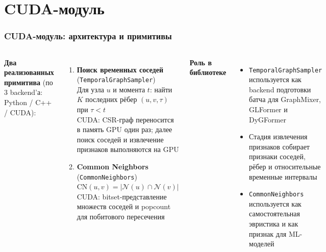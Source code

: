 \documentclass[aspectratio=169]{beamer}
\begin{document}
\section{CUDA-модуль}
\begin{frame}
  \frametitle{CUDA-модуль: архитектура и примитивы}
  \small
  \begin{columns}[T]
    \textbf{Два реализованных примитива} (по 3 backend'а: Python / C++ / CUDA):
    \vspace{0.2cm}
    \begin{enumerate}
      \item \textbf{Поиск временных соседей} (\texttt{TemporalGraphSampler})\\
        Для узла $u$ и момента $t$: найти $K$ последних рёбер $(u, v, \tau)$ при $\tau < t$\\
        {\small CUDA: CSR-граф переносится в память GPU один раз; далее поиск соседей и извлечение признаков выполняются на GPU}
      \vspace{0.2cm}
      \item \textbf{Common Neighbors} (\texttt{CommonNeighbors})\\
        $\text{CN}(u, v) = |\mathcal{N}(u) \cap \mathcal{N}(v)|$\\
        {\small CUDA: bitset-представление множеств соседей и popcount для побитового пересечения}
    \end{enumerate}
    \textbf{Роль в библиотеке}
    \begin{itemize}
      \item \texttt{TemporalGraphSampler} используется как backend подготовки батча для GraphMixer, GLFormer и DyGFormer
      \item Стадия извлечения признаков собирает признаки соседей, рёбер и относительные временные интервалы
      \item \texttt{CommonNeighbors} используется как самостоятельная эвристика и как признак для ML-моделей
    \end{itemize}
  \end{columns}
\end{frame}
\end{document}
